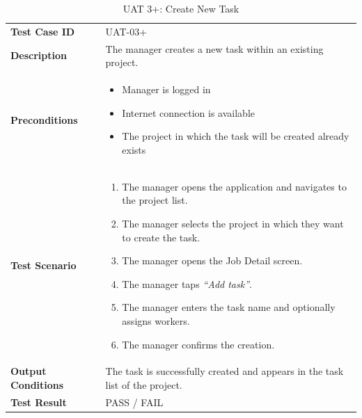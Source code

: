 \documentclass[12pt,a4paper]{article}
\begin{document}
\begin{table}[h]
\centering
\caption{UAT 3+: Create New Task}
\begin{tabularx}{\textwidth}{>{\bfseries}l X}
\toprule
Test Case ID & UAT-03+ \\
Description & The manager creates a new task within an existing project. \\
Preconditions &
\begin{itemize}[noitemsep]
    \item Manager is logged in
    \item Internet connection is available
    \item The project in which the task will be created already exists
\end{itemize} \\
Test Scenario &
\begin{enumerate}[noitemsep]
    \item The manager opens the application and navigates to the project list.
    \item The manager selects the project in which they want to create the task.
    \item The manager opens the Job Detail screen.
    \item The manager taps \emph{``Add task''}.
    \item The manager enters the task name and optionally assigns workers.
    \item The manager confirms the creation.
\end{enumerate} \\
Output Conditions & The task is successfully created and appears in the task list of the project. \\
Test Result & PASS / FAIL \\
\bottomrule
\end{tabularx}
\end{table}
\end{document}
